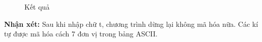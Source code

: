 \documentclass[a4paper,12pt]{article}
\begin{document}
\begin{figure}[ht!]
	\centerline{}
	\caption{Kết quả}
	\label{fig:ass1}
\end{figure}
\noindent
\textbf{Nhận xét: }Sau khi nhập chữ t, chương trình dừng lại không mã hóa nữa. Các kí tự được mã hóa cách 7 đơn vị trong bảng ASCII.
\end{document}
